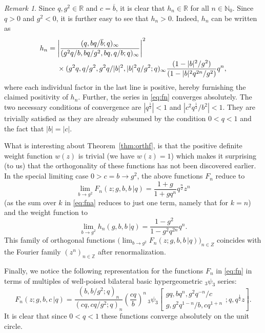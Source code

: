 \documentclass[reqno,12pt]{amsart}
\theoremstyle{remark}
\newtheorem{remark}{Remark}
\numberwithin{equation}{section}
\newcommand{\N}{\mathbb N}
\newcommand{\Z}{\mathbb Z}
\newcommand{\R}{\mathbb R}
\begin{document}
\begin{remark}
Since $q,g^2\in\R$ and $c=\overline{b}$, it is clear
that $h_n\in\R$ for all $n\in\N_0$. Since $q>0$ and $g^2<0$,
it is further easy to see that $h_n>0$. Indeed, $h_n$ can be written as
\begin{align}\notag
  h_n&=\left| \frac{(q,bq/\overline{b};q)_\infty}
       {(g^2q/b,bq/g^2,bq,q/b;q)_\infty}\right|^2\\
&\quad\;\times (g^2q,q/g^2,g^2q/|b|^2,|b|^2q/g^2;q)_\infty
\frac{(1-|b|^2/g^2)}{(1-|b|^2q^{2n}/g^2)}q^n,
\end{align}
where each individual factor in the last line is positive,
hereby furnishing the claimed positivity of $h_n$.
Further, the series in \eqref{eq:fn} converges absolutely.
The two necessary conditions of convergence are
$|q^{\frac 12}|<1$ and $|c^2q^{\frac 12}/b^2|<1$.
They are trivially satisfied as they are already subsumed
by the condition $0<q<1$ and the fact that $|b|=|c|$.

What is interesting about Theorem~\ref{thm:orthf}, is that
the positive definite weight function $w(z)$ is trivial
(we have $w(z)=1$) which makes it surprising (to us)
that the orthogonality of these functions has not been
discovered earlier. In the special limiting case $0>c=b\to g^2$,
the above functions $F_n$ reduce  to
$$
\lim_{b\to g^2}F_n(z;g,b,b\,|q)=\frac{1+g}{1+gq^n}q^{\frac n2}z^n
$$
(as the sum over $k$ in \eqref{eq:fna} reduces to just one term,
namely that for $k=n$) and the weight function to
$$
\lim_{b\to g^2}h_n(g,b,b\,|q)=\frac{1-g^2}{1-g^2q^{2n}}q^n.
$$
This family of orthogonal functions
$\big(\!\lim_{b\to g^2}F_n(z;g,b,b\,|q)\big)_{n\in Z}$ coincides with
the Fourier family $(z^n)_{n\in\Z}$ after renormalization.

Finally, we notice the following representation
for the functions $F_n$ in \eqref{eq:fn} in terms of multiples
of well-poised bilateral basic hypergeometric $_3\psi_3$ series:
\begin{equation}
F_n(z;g,b,c\,|q)=\frac{(b,b/g^2;q)_n}{(cq,cq/g^2;q)_n}
\left(\frac{cq}b\right)^n\,{}_3\psi_3\!
\left[\begin{matrix}gq,bq^n,g^2q^{-n}/c\\
g,g^2q^{1-n}/b,cq^{1+n}\end{matrix};q,q^{\frac 12}z\right].
\end{equation}
It is clear that since $0<q<1$
these functions converge absolutely on the unit circle.
\end{remark}
\end{document}
